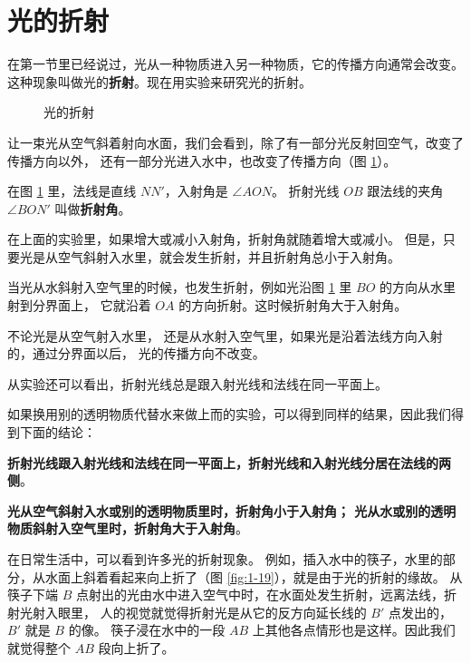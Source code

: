 \section{光的折射}\label{sec:1-5}

在第一节里已经说过，光从一种物质进入另一种物质，它的传播方向通常会改变。
这种现象叫做光的\textbf{折射}。现在用实验来研究光的折射。

\begin{figure}
    \centering
    
    \caption{光的折射}\label{fig:1-18}
\end{figure}

让一束光从空气斜着射向水面，我们会看到，除了有一部分光反射回空气，改变了传播方向以外，
还有一部分光进入水中，也改变了传播方向（图 \ref{fig:1-18}）\footnotemark。

在图 \ref{fig:1-18} 里，法线是直线 $NN'$，入射角是 $\angle AON$。
折射光线 $OB$ 跟法线的夹角 $\angle BON'$ 叫做\textbf{折射角}。

在上面的实验里，如果增大或减小入射角，折射角就随着增大或减小。
但是，只要光是从空气斜射入水里，就会发生折射，并且折射角总小于入射角。

当光从水斜射入空气里的时候，也发生折射，例如光沿图 \ref{fig:1-18} 里 $BO$ 的方向从水里射到分界面上，
它就沿着 $OA$ 的方向折射。这时候折射角大于入射角。

不论光是从空气射入水里， 还是从水射入空气里，如果光是沿着法线方向入射的，通过分界面以后，
光的传播方向不改变。

从实验还可以看出，折射光线总是跟入射光线和法线在同一平面上。

如果换用别的透明物质代替水来做上而的实验，可以得到同样的结果，因此我们得到下面的结论：

\textbf{折射光线跟入射光线和法线在同一平面上，折射光线和入射光线分居在法线的两侧}。

\textbf{%
光从空气斜射入水或别的透明物质里时，折射角小于入射角；
光从水或别的透明物质斜射入空气里时，折射角大于入射角}。

在日常生活中，可以看到许多光的折射现象。
例如，插入水中的筷子，水里的部分，从水面上斜着看起来向上折了（图 \ref{fig:1-19}），就是由于光的折射的缘故。
从筷子下端 $B$ 点射出的光由水中进入空气中时，在水面处发生折射，远离法线，折射光射入眼里，
人的视觉就觉得折射光是从它的反方向延长线的 $B'$ 点发出的，$B'$ 就是 $B$ 的像。
筷子浸在水中的一段 $AB$ 上其他各点情形也是这样。因此我们就觉得整个 $AB$ 段向上折了。

